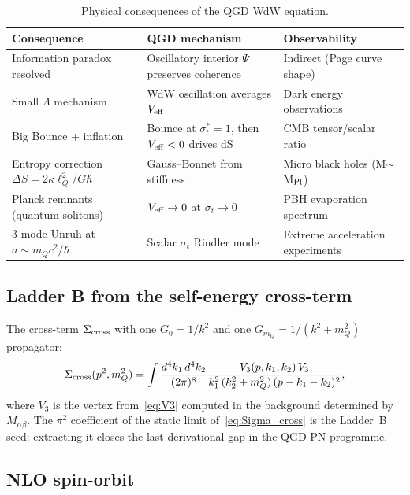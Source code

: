 \documentclass[11pt,a4paper]{article}
\theoremstyle{plain}
\theoremstyle{definition}
\theoremstyle{remark}
\newcommand{\lQ}{\ell_Q}
\newcommand{\mQ}{m_Q}
\newcommand{\sigt}{\sigma_t}
\begin{document}
\begin{table}[h]
\centering\small\renewcommand{\arraystretch}{1.3}
\caption{Physical consequences of the QGD WdW equation.}
\label{tab:WdW_cons}
\begin{tabular}{@{}p{5cm}p{4.5cm}p{3.5cm}@{}}
\toprule
Consequence & QGD mechanism & Observability \\
\midrule
Information paradox resolved &
  Oscillatory interior $\Psi$ preserves coherence &
  Indirect (Page curve shape) \\
Small $\Lambda$ mechanism &
  WdW oscillation averages $V_{\rm eff}$ &
  Dark energy observations \\
Big Bounce + inflation &
  Bounce at $\sigt^*=1$, then $V_{\rm eff}<0$ drives dS &
  CMB tensor/scalar ratio \\
Entropy correction $\Delta S = 2\kappa\lQ^2/G\hbar$ &
  Gauss--Bonnet from stiffness &
  Micro black holes (M$\sim$M$_{\rm Pl}$) \\
Planck remnants (quantum solitons) &
  $V_{\rm eff}\to0$ at $\sigt\to0$ &
  PBH evaporation spectrum \\
3-mode Unruh at $a\sim\mQ c^2/\hbar$ &
  Scalar $\sigt$ Rindler mode &
  Extreme acceleration experiments \\
\bottomrule
\end{tabular}
\end{table}



\subsection{Ladder B from the self-energy cross-term}

The cross-term $\Sigma_{\rm cross}$ with one $G_0=1/k^2$ and one
$G_{\mQ}=1/(k^2+\mQ^2)$ propagator:
\begin{equation}
  \Sigma_{\rm cross}(p^2,\mQ^2)
  = \int\frac{d^4k_1\,d^4k_2}{(2\pi)^8}
    \frac{V_3(p,k_1,k_2)\,V_3}{k_1^2\,(k_2^2+\mQ^2)\,(p-k_1-k_2)^2},
  \label{eq:Sigma_cross}
\end{equation}
where $V_3$ is the vertex from~\eqref{eq:V3} computed in the background
determined by $M_{\alpha\beta}$.  The $\pi^2$ coefficient of the static
limit of~\eqref{eq:Sigma_cross} is the Ladder~B seed: extracting it
closes the last derivational gap in the QGD PN programme.

\subsection{NLO spin-orbit}
\end{document}

